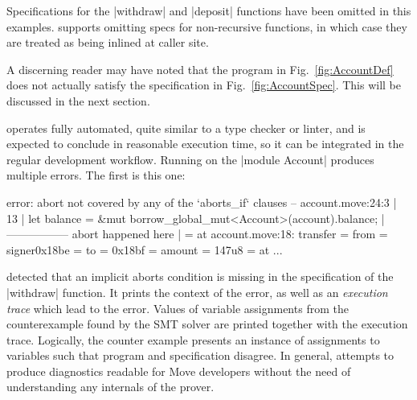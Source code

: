 Specifications for the |withdraw| and |deposit| functions have been omitted in
this examples. \MVP supports omitting specs for non-recursive functions, in
which case they are treated as being inlined at caller site.

A discerning reader may have noted that the program in Fig.~\ref{fig:AccountDef}
does not actually satisfy the specification in Fig.~\ref{fig:AccountSpec}. This
will be discussed in the next section.



\label{sec:RunningProver}

\MVP operates fully automated, quite similar to a type checker or linter, and is
expected to conclude in reasonable execution time, so it can be integrated in
the regular development workflow. Running \MVP on the |module Account| produces
multiple errors. The first is this one:

\begin{MoveDiag}
error: abort not covered by any of the `aborts_if` clauses
   -- account.move:24:3
   |
13 |       let balance = &mut borrow_global_mut<Account>(account).balance;
   |                          ----------------- abort happened here
   |
   =     at account.move:18: transfer
   =         from = signer{0x18be}
   =         to = 0x18bf
   =         amount = 147u8
   =     at ...
\end{MoveDiag}

\noindent \MVP detected that an implicit aborts condition is missing in the
specification of the |withdraw| function. It prints the context of the error, as
well as an \emph{execution trace} which lead to the error. Values of variable
assignments from the counterexample found by the SMT solver are printed together
with the execution trace. Logically, the counter example presents an instance of
assignments to variables such that program and specification disagree. In
general, \MVP attempts to produce diagnostics readable for Move developers
without the need of understanding any internals of the prover.

